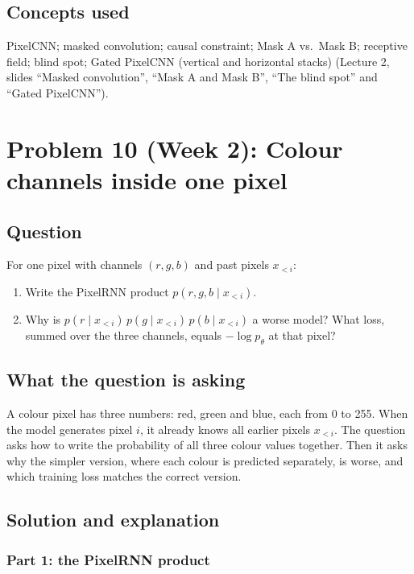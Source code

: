 \documentclass[12pt,a4paper]{article}
\begin{document}
\subsection{Concepts used}

PixelCNN; masked convolution; causal constraint; Mask A vs.\ Mask B; receptive field; blind spot; Gated PixelCNN (vertical and horizontal stacks) (Lecture 2, slides ``Masked convolution'', ``Mask A and Mask B'', ``The blind spot'' and ``Gated PixelCNN'').

\section{Problem 10 (Week 2): Colour channels inside one pixel}

\subsection{Question}

For one pixel with channels $(r, g, b)$ and past pixels $x_{<i}$:

\begin{enumerate}[leftmargin=*]
\item Write the PixelRNN product $p(r, g, b \mid x_{<i})$.
\item Why is $p(r \mid x_{<i})\, p(g \mid x_{<i})\, p(b \mid x_{<i})$ a worse model? What loss, summed over the three channels, equals $-\log p_\theta$ at that pixel?
\end{enumerate}

\subsection{What the question is asking}

A colour pixel has three numbers: red, green and blue, each from 0 to 255. When the model generates pixel $i$, it already knows all earlier pixels $x_{<i}$. The question asks how to write the probability of all three colour values together. Then it asks why the simpler version, where each colour is predicted separately, is worse, and which training loss matches the correct version.

\subsection{Solution and explanation}

\subsubsection{Part 1: the PixelRNN product}
\end{document}
